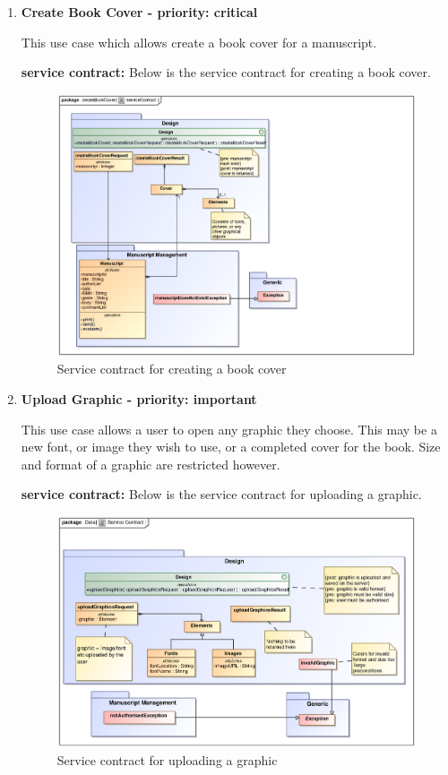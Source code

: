 \begin{enumerate}
\item \textbf{Create Book Cover - priority: critical}
\par{This use case which allows create a book cover for a  manuscript.}
\par{\textbf{service contract:} Below is the service contract for creating a book cover.
}
 \begin{figure}[h]
\includegraphics[scale=0.5]{epsImages/Design/createBookCover.eps}
\caption{Service contract for creating a book cover}
\end{figure}

\item \textbf{Upload Graphic - priority: important}\\
\par{This use case allows a user to open any graphic they choose. This may be a new font, or image they wish to use, or a completed cover for the book. Size and format of a graphic are restricted however.}
\par{\textbf{service contract:} Below is the service contract for uploading a graphic.
}
\begin{figure}[h]
\includegraphics[scale=0.5]{epsImages/Design/uploadGraphicsServiceContract.eps}
\caption{Service contract for uploading a graphic}
\end{figure}
\end{enumerate}
